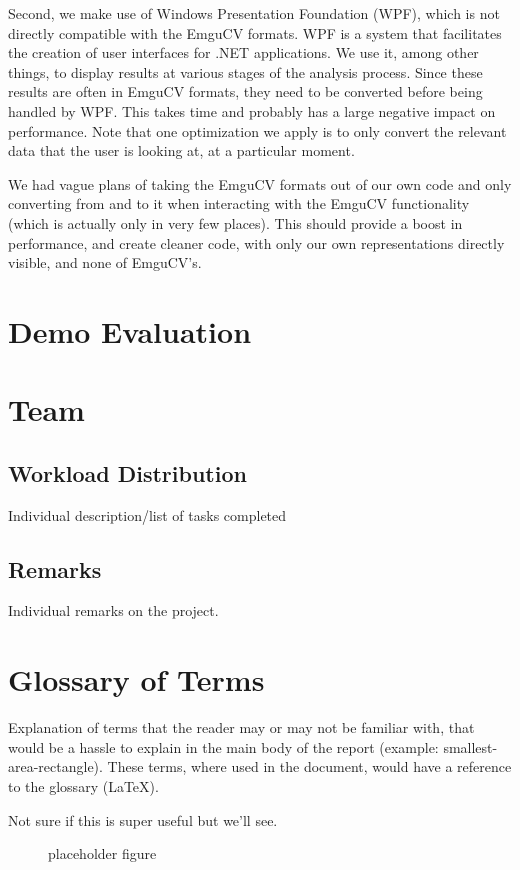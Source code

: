 \documentclass[10pt,twocolumn]{article}
\begin{document}
Second, we make use of Windows Presentation Foundation (WPF), which is not directly compatible with the EmguCV formats. WPF is a system that facilitates the creation of user interfaces for .NET applications. We use it, among other things, to display results at various stages of the analysis process. Since these results are often in EmguCV formats, they need to be converted before being handled by WPF. This takes time and probably has a large negative impact on performance. Note that one optimization we apply is to only convert the relevant data that the user is looking at, at a particular moment.

We had vague plans of taking the EmguCV formats out of our own code and only converting from and to it when interacting with the EmguCV functionality (which is actually only in very few places). This should provide a boost in performance, and create cleaner code, with only our own representations directly visible, and none of EmguCV's.

\section{Demo Evaluation}

\section{Team}

\subsection{Workload Distribution}
Individual description/list of tasks completed 

\subsection{Remarks}
Individual remarks on the project.

\section{Glossary of Terms}
Explanation of terms that the reader may or may not be familiar with, that would be a hassle to explain in the main body of the report (example: smallest-area-rectangle). These terms, where used in the document, would have a reference to the glossary (LaTeX).

Not sure if this is super useful but we'll see.

\begin{figure}[!b]
	  \begin{center}
	  \end{center}

  \caption{\small placeholder figure}
  \label{azahar2}
\end{figure}



\end{document}
